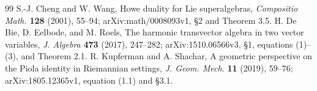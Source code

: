 \begin{thebibliography}{99}
S.-J. Cheng and W. Wang, Howe duality for Lie superalgebras,
\emph{Compositio Math.} \textbf{128} (2001), 55--94;
arXiv:math/0008093v1, \S2 and Theorem 3.5.
H. De Bie, D. Eelbode, and M. Roels,
The harmonic transvector algebra in two vector variables,
\emph{J. Algebra} \textbf{473} (2017), 247--282;
arXiv:1510.06566v3, \S1, equations (1)--(3), and Theorem 2.1.
R. Kupferman and A. Shachar,
A geometric perspective on the Piola identity in Riemannian settings,
\emph{J. Geom. Mech.} \textbf{11} (2019), 59--76;
arXiv:1805.12365v1, equation (1.1) and \S3.1.
\end{thebibliography}
